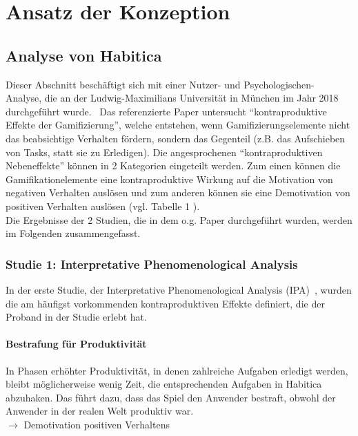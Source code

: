 \documentclass[sigconf, nonacm]{acmart}
\begin{document}
\section{Ansatz der Konzeption}\label{sec:conception}

\subsection{Analyse von Habitica}\label{sec:analysis}
Dieser Abschnitt beschäftigt sich mit einer Nutzer- und Psychologischen- Analyse, die an der Ludwig-Maximilians Universität in München im Jahr 2018 durchgeführt wurde.~\cite{diefenbach_counterproductive_2019} Das referenzierte Paper untersucht \enquote{kontraproduktive Effekte der Gamifizierung}, welche entstehen, wenn Gamifizierungselemente nicht das beabsichtige Verhalten fördern, sondern das Gegenteil (z.B. das Aufschieben von Tasks, statt sie zu Erledigen). 
Die angesprochenen \enquote{kontraproduktiven Nebeneffekte} können in 2 Kategorien eingeteilt werden. Zum einen können die Gamifikationelemente eine kontraproduktive Wirkung auf die Motivation von negativen Verhalten auslösen und zum anderen können sie eine Demotivation von positiven Verhalten auslösen (vgl. Tabelle 1 \cite{diefenbach_counterproductive_2019}).
\\
Die Ergebnisse der 2 Studien, die in dem o.g. Paper durchgeführt wurden, werden im Folgenden zusammengefasst.
\\
\subsubsection{Studie 1: Interpretative Phenomenological Analysis}
In der erste Studie, der  Interpretative Phenomenological Analysis (IPA)~\cite{smith_reflecting_2004}, wurden die am häufigst vorkommenden kontraproduktiven Effekte definiert, die der Proband in der Studie erlebt hat.

\paragraph{Bestrafung für Produktivität}\label{sec:cpe1}
In Phasen erhöhter Produktivität, in denen zahlreiche Aufgaben erledigt werden, bleibt möglicherweise wenig Zeit, die entsprechenden Aufgaben in Habitica abzuhaken. Das führt dazu, dass das Spiel den Anwender bestraft, obwohl der Anwender in der realen Welt produktiv war.\\
$\rightarrow$ Demotivation positiven Verhaltens
\end{document}

